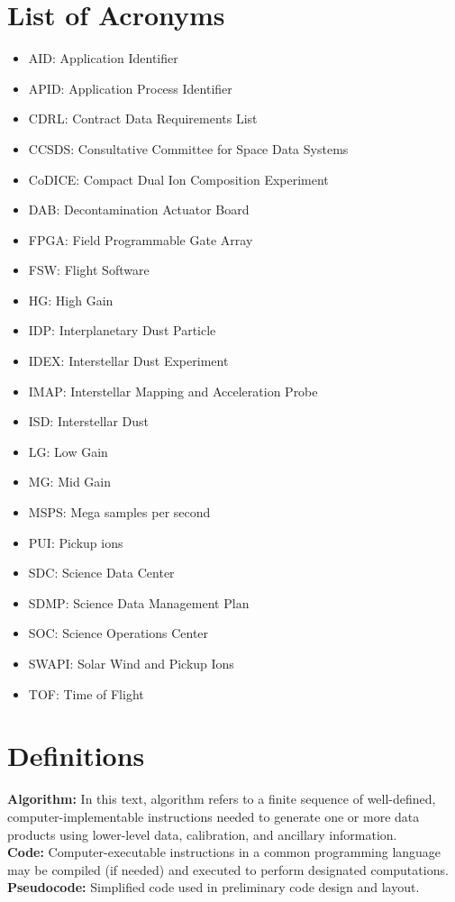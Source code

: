 \documentclass{report}
\begin{document}
\section{List of Acronyms}
\begin{itemize}
  \item AID: Application Identifier
  \item APID: Application Process Identifier
  \item CDRL: Contract Data Requirements List
  \item CCSDS: Consultative Committee for Space Data Systems
  \item CoDICE: Compact Dual Ion Composition Experiment
  \item DAB: Decontamination Actuator Board
  \item FPGA: Field Programmable Gate Array
  \item FSW: Flight Software
  \item HG: High Gain
  \item IDP: Interplanetary Dust Particle
  \item IDEX: Interstellar Dust Experiment
  \item IMAP: Interstellar Mapping and Acceleration Probe
  \item ISD: Interstellar Dust
  \item LG: Low Gain
  \item MG: Mid Gain
  \item MSPS: Mega samples per second
  \item PUI: Pickup ions
  \item SDC: Science Data Center
  \item SDMP: Science Data Management Plan
  \item SOC: Science Operations Center
  \item SWAPI: Solar Wind and Pickup Ions
  \item TOF: Time of Flight
\end{itemize}

\section{Definitions}
\textbf{Algorithm:} In this text, algorithm refers to a finite sequence of well-defined, computer-implementable instructions needed to generate one or more data products using lower-level data, calibration, and ancillary information.\\[0.5\baselineskip]
\textbf{Code:} Computer-executable instructions in a common programming language may be compiled (if needed) and executed to perform designated computations.\\[0.5\baselineskip]
\textbf{Pseudocode:} Simplified code used in preliminary code design and layout.
\end{document}
